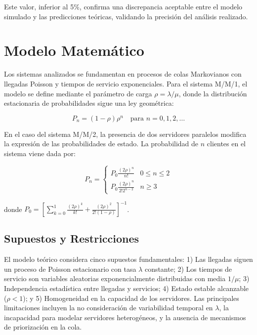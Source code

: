 \documentclass[12pt, a4paper]{article}
\begin{document}
    Este valor, inferior al 5\%, confirma una discrepancia aceptable entre el modelo simulado y las predicciones teóricas, validando la precisión del análisis realizado.
    
    \section{Modelo Matemático}
    \label{sec:modelo-matematico}
    
    Los sistemas analizados se fundamentan en procesos de colas Markovianos con llegadas Poisson y tiempos de servicio exponenciales. Para el sistema M/M/1, el modelo se define mediante el parámetro de carga $\rho = \lambda/\mu$, donde la distribución estacionaria de probabilidades sigue una ley geométrica:
    
    \begin{equation}
    	P_n = (1-\rho)\rho^n \quad \text{para } n = 0,1,2,\ldots
    \end{equation}
    
    En el caso del sistema M/M/2, la presencia de dos servidores paralelos modifica la expresión de las probabilidades de estado. La probabilidad de $n$ clientes en el sistema viene dada por:
    
    \begin{equation}
    	P_n = \begin{cases}
    		P_0 \frac{(2\rho)^n}{n!} & 0 \leq n \leq 2 \\
    		P_0 \frac{(2\rho)^n}{2!2^{n-2}} & n \geq 3
    	\end{cases}
    \end{equation}
    
    donde $P_0 = \left[\sum_{k=0}^{1}\frac{(2\rho)^k}{k!} + \frac{(2\rho)^2}{2!(1-\rho)}\right]^{-1}$.
    
    \subsection{Supuestos y Restricciones}
    El modelo teórico considera cinco supuestos fundamentales: 1) Las llegadas siguen un proceso de Poisson estacionario con tasa $\lambda$ constante; 2) Los tiempos de servicio son variables aleatorias exponencialmente distribuidas con media $1/\mu$; 3) Independencia estadística entre llegadas y servicios; 4) Estado estable alcanzable ($\rho < 1$); y 5) Homogeneidad en la capacidad de los servidores. Las principales limitaciones incluyen la no consideración de variabilidad temporal en $\lambda$, la incapacidad para modelar servidores heterogéneos, y la ausencia de mecanismos de priorización en la cola.
    
\end{document}
